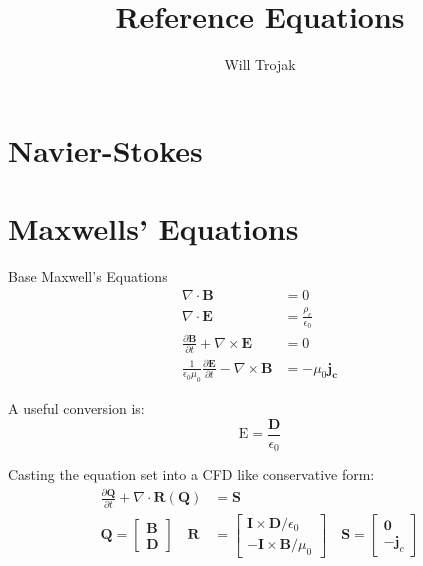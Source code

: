 \documentclass[12pt]{article}
\begin{document}
\title{Reference Equations}
\author{Will Trojak}

\maketitle



\section{Navier-Stokes}



\section{Maxwells' Equations}

	Base Maxwell's Equations
	\begin{align}
		\nabla \cdot \mathbf{B} &= 0\\
		\nabla \cdot \mathbf{E} &= \frac{\rho_c}{\epsilon_0} \\
		\frac{\partial \mathbf{B}}{\partial t} + \nabla \times \mathbf{E} &= 0 \\ 
		\frac{1}{\epsilon_0 \mu_0} \frac{\partial \mathbf{E}}{\partial t} - \nabla \times \mathbf{B} &= -\mu_0 \mathbf{j_c} 
	\end{align}

	A useful conversion is:
	\begin{equation}
		\mathrm{E} = \frac{\mathbf{D}}{\epsilon_0}	
	\end{equation}
	
	Casting the equation set into a CFD like conservative form:
	\begin{align}
		\frac{\partial \mathbf{Q}}{\partial t} + \nabla \cdot \mathbf{R(\mathbf{Q})} &= \mathbf{S} \\
		\mathbf{Q} = 
			\begin{bmatrix}
       			\mathbf{B} \\
       			\mathbf{D}
     		\end{bmatrix} \quad
     	\mathbf{R} &= \begin{bmatrix}
       			\mathbf{I} \times \mathbf{D}/\epsilon_0 \\
       		    -\mathbf{I} \times \mathbf{B}/\mu_0
     		\end{bmatrix} \quad
     	\mathbf{S} = \begin{bmatrix}
     			\mathbf{0} \\
       			-\mathbf{j}_c
     		\end{bmatrix}
	\end{align}		
	
\end{document}
